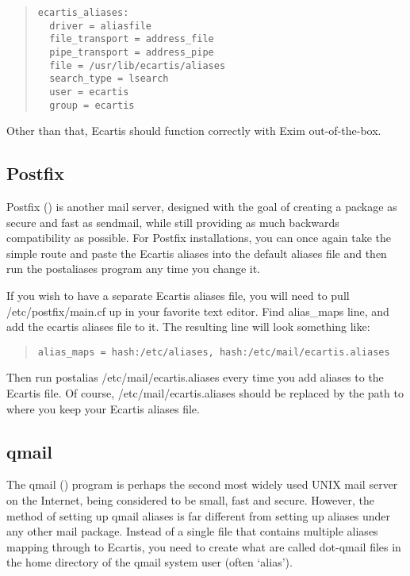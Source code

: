 \documentclass{book}
\begin{document}
\begin{quote}
\footnotesize
\begin{verbatim}
ecartis_aliases:
  driver = aliasfile
  file_transport = address_file
  pipe_transport = address_pipe
  file = /usr/lib/ecartis/aliases
  search_type = lsearch
  user = ecartis
  group = ecartis
\end{verbatim}
\end{quote}
   
Other than that, Ecartis should function correctly with Exim out-of-the-box.
   
\subsection{Postfix}
\label{starting:filters:postfix}
   
Postfix () is another mail server, designed with
the goal of creating a package as secure and fast as sendmail, while still
providing as much backwards compatibility as possible.  For Postfix
installations, you can once again take the simple route and paste the Ecartis
aliases into the default aliases file and then run the postaliases program any
time you change it.
   
If you wish to have a separate Ecartis aliases file, you will need to pull
/etc/postfix/main.cf up in your favorite text editor.  Find alias\_maps line,
and add the ecartis aliases file to it.  The resulting line will look
something like:
   
\begin{quote}   
\footnotesize
\begin{verbatim}
alias_maps = hash:/etc/aliases, hash:/etc/mail/ecartis.aliases
\end{verbatim}
\end{quote}
   
Then run postalias /etc/mail/ecartis.aliases every time you add aliases to the
Ecartis file.  Of course, /etc/mail/ecartis.aliases should be replaced by the
path to where you keep your Ecartis aliases file.
   
\subsection{qmail}
\label{starting:filters:qmail}

The qmail () program is perhaps the second most
widely used UNIX mail server on the Internet, being considered to be small,
fast and secure.  However, the method of setting up qmail aliases is far
different from setting up aliases under any other mail package.  Instead of a
single file that contains multiple aliases mapping through to Ecartis, you
need to create what are called dot-qmail files in the home directory of the
qmail system user (often `alias').
   
\end{document}
